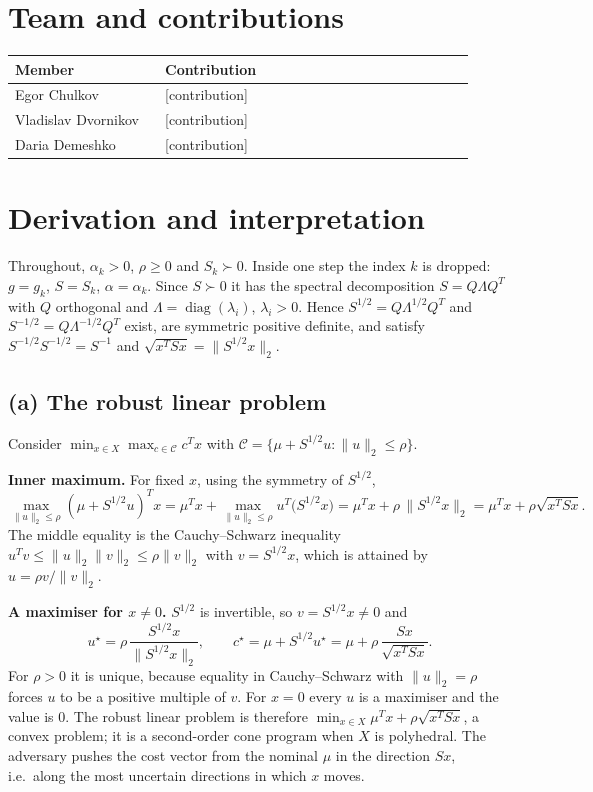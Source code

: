 \documentclass[11pt,a4paper]{article}
\newcommand{\norm}[1]{\lVert #1\rVert_2}
\DeclareMathOperator{\diag}{diag}
\begin{document}
\section*{Team and contributions}
\begin{center}
\begin{tabular}{@{}p{0.3\linewidth}p{0.62\linewidth}@{}}
\toprule
Member & Contribution \\
\midrule
Egor Chulkov & [contribution] \\
Vladislav Dvornikov & [contribution] \\
Daria Demeshko & [contribution] \\
\bottomrule
\end{tabular}
\end{center}

\newpage
\tableofcontents
\newpage


\section{Derivation and interpretation}\label{sec:derivation}

Throughout, $\alpha_k>0$, $\rho\ge0$ and $S_k\succ0$. Inside one step the index $k$ is
dropped: $g=g_k$, $S=S_k$, $\alpha=\alpha_k$. Since $S\succ0$ it has the spectral
decomposition $S=Q\Lambda Q^T$ with $Q$ orthogonal and $\Lambda=\diag(\lambda_i)$,
$\lambda_i>0$. Hence $S^{1/2}=Q\Lambda^{1/2}Q^T$ and $S^{-1/2}=Q\Lambda^{-1/2}Q^T$ exist,
are symmetric positive definite, and satisfy $S^{-1/2}S^{-1/2}=S^{-1}$ and
$\sqrt{x^TSx}=\norm{S^{1/2}x}$.

\subsection{(a) The robust linear problem}

Consider $\min_{x\in X}\max_{c\in\mathcal C}c^Tx$ with
$\mathcal C=\{\mu+S^{1/2}u:\norm u\le\rho\}$.

\textbf{Inner maximum.} For fixed $x$, using the symmetry of $S^{1/2}$,
\begin{equation*}
\max_{\norm u\le\rho}(\mu+S^{1/2}u)^Tx=\mu^Tx+\max_{\norm u\le\rho}u^T\big(S^{1/2}x\big)
=\mu^Tx+\rho\,\norm{S^{1/2}x}=\mu^Tx+\rho\sqrt{x^TSx}.
\end{equation*}
The middle equality is the Cauchy--Schwarz inequality
$u^Tv\le\norm u\norm v\le\rho\norm v$ with $v=S^{1/2}x$, which is attained by $u=\rho v/\norm v$.

\textbf{A maximiser for $x\ne0$.} $S^{1/2}$ is invertible, so $v=S^{1/2}x\ne0$ and
\begin{equation*}
u^\star=\rho\,\frac{S^{1/2}x}{\norm{S^{1/2}x}},\qquad
c^\star=\mu+S^{1/2}u^\star=\mu+\rho\,\frac{Sx}{\sqrt{x^TSx}} .
\end{equation*}
For $\rho>0$ it is unique, because equality in Cauchy--Schwarz with $\norm u=\rho$ forces
$u$ to be a positive multiple of $v$. For $x=0$ every $u$ is a maximiser and the value is $0$.
The robust linear problem is therefore $\min_{x\in X}\mu^Tx+\rho\sqrt{x^TSx}$, a convex
problem; it is a second-order cone program when $X$ is polyhedral. The adversary pushes
the cost vector from the nominal $\mu$ in the direction $Sx$, i.e.\ along the most uncertain
directions in which $x$ moves.
\end{document}
